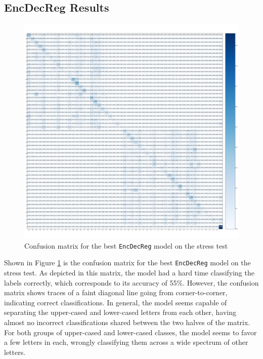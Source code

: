 \subsection{EncDecReg Results}
\begin{figure}[H]
    \centering
    \includegraphics[width=1\textwidth]{fig/results/experiment4/encdecreg/confusion_matrix.png}
    \caption{Confusion matrix for the best {\tt EncDecReg} model on the stress test}
    \label{fig:result4_encdecreg_confusion_matrix}
\end{figure}

Shown in Figure \ref{fig:result4_encdecreg_confusion_matrix} is the confusion matrix for the best {\tt EncDecReg} model on the stress test. As depicted in this matrix, the model had a hard time classifying the labels correctly, which corresponds to its accuracy of 55\%. However, the confusion matrix shows traces of a faint diagonal line going from corner-to-corner, indicating correct classifications. In general, the model seems capable of separating the upper-cased and lower-cased letters from each other, having almost no incorrect classifications shared between the two halves of the matrix. For both groups of upper-cased and lower-cased classes, the model seems to favor a few letters in each, wrongly classifying them across a wide spectrum of other letters.

